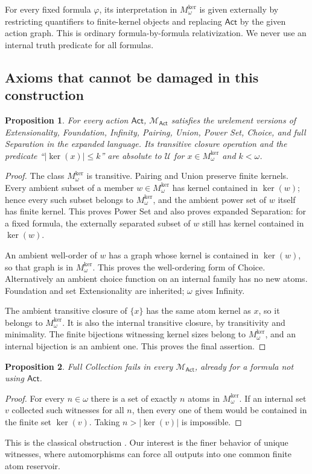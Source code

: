 \documentclass[11pt,letterpaper]{article}
\newtheorem{proposition}[proposition]{Proposition}\aliascntresetthe{proposition}
\theoremstyle{definition}
\theoremstyle{remark}
\newcommand{\kerat}{\operatorname{ker}}
\newcommand{\Mker}{M^{\mathrm{ker}}}
\newcommand{\Uk}{\mathcal U}
\newcommand{\Act}{\mathsf{Act}}
\newcommand{\MAct}{\mathcal M_{\Act}}
\newcommand{\abs}[1]{\lvert #1\rvert}
\begin{document}
For every fixed formula $\varphi$, its interpretation in $\Mker_\omega$ is given externally by restricting quantifiers to finite-kernel objects and replacing $\Act$ by the given action graph. This is ordinary formula-by-formula relativization. We never use an internal truth predicate for all formulas.

\subsection{Axioms that cannot be damaged in this construction}
\begin{proposition}\label{hset:ns:prop:basic}
For every action $\Act$, $\MAct$ satisfies the urelement versions of Extensionality, Foundation, Infinity, Pairing, Union, Power Set, Choice, and full Separation in the expanded language. Its transitive closure operation and the predicate ``$\abs{\kerat(x)}\le k$'' are absolute to $\Uk$ for $x\in \Mker_\omega$ and $k<\omega$.
\end{proposition}
\begin{proof}
The class $\Mker_\omega$ is transitive. Pairing and Union preserve finite kernels. Every ambient subset of a member $w\in \Mker_\omega$ has kernel contained in $\kerat(w)$; hence every such subset belongs to $\Mker_\omega$, and the ambient power set of $w$ itself has finite kernel. This proves Power Set and also proves expanded Separation: for a fixed formula, the externally separated subset of $w$ still has kernel contained in $\kerat(w)$.

An ambient well-order of $w$ has a graph whose kernel is contained in $\kerat(w)$, so that graph is in $\Mker_\omega$. This proves the well-ordering form of Choice. Alternatively an ambient choice function on an internal family has no new atoms. Foundation and set Extensionality are inherited; $\omega$ gives Infinity.

The ambient transitive closure of $\{x\}$ has the same atom kernel as $x$, so it belongs to $\Mker_\omega$. It is also the internal transitive closure, by transitivity and minimality. The finite bijections witnessing kernel sizes belong to $\Mker_\omega$, and an internal bijection is an ambient one. This proves the final assertion.
\end{proof}

\begin{proposition}\label{hset:ns:prop:nocollection}
Full Collection fails in every $\MAct$, already for a formula not using $\Act$.
\end{proposition}
\begin{proof}
For every $n\in\omega$ there is a set of exactly $n$ atoms in $\Mker_\omega$. If an internal set $v$ collected such witnesses for all $n$, then every one of them would be contained in the finite set $\kerat(v)$. Taking $n>\abs{\kerat(v)}$ is impossible.
\end{proof}
This is the classical obstruction \cite{HamkinsYao}. Our interest is the finer behavior of unique witnesses, where automorphisms can force all outputs into one common finite atom reservoir.
\end{document}
